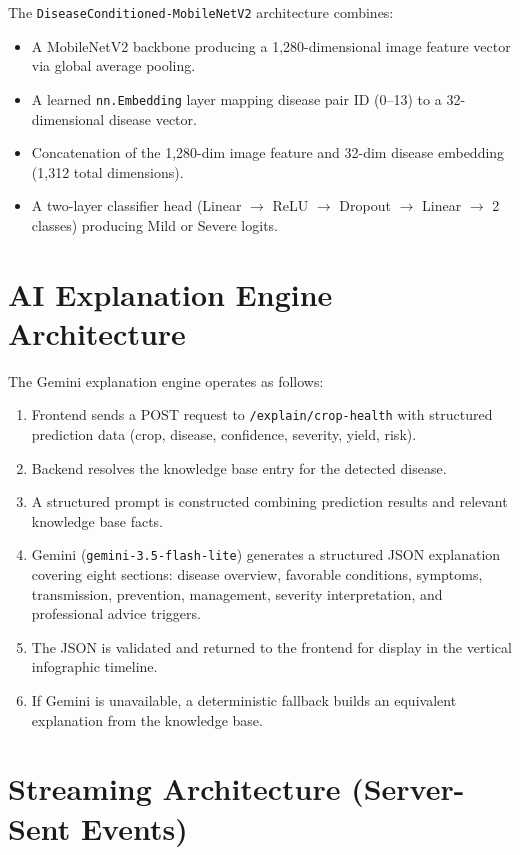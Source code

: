 The \texttt{DiseaseConditioned-}\allowbreak\texttt{MobileNetV2} architecture combines:
\begin{itemize}
    \item A MobileNetV2 backbone producing a 1,280-dimensional image feature vector via global average pooling.
    \item A learned \texttt{nn.Embedding} layer mapping disease pair ID (0--13) to a 32-dimensional disease vector.
    \item Concatenation of the 1,280-dim image feature and 32-dim disease embedding (1,312 total dimensions).
    \item A two-layer classifier head (Linear $\rightarrow$ ReLU $\rightarrow$ Dropout $\rightarrow$ Linear $\rightarrow$ 2 classes) producing Mild or Severe logits.
\end{itemize}

\section{AI Explanation Engine Architecture}

The Gemini explanation engine operates as follows:
\begin{enumerate}
    \item Frontend sends a POST request to \texttt{/explain/crop-health} with structured prediction data (crop, disease, confidence, severity, yield, risk).
    \item Backend resolves the knowledge base entry for the detected disease.
    \item A structured prompt is constructed combining prediction results and relevant knowledge base facts.
    \item Gemini (\texttt{gemini-3.5-flash-lite}) generates a structured JSON explanation covering eight sections: disease overview, favorable conditions, symptoms, transmission, prevention, management, severity interpretation, and professional advice triggers.
    \item The JSON is validated and returned to the frontend for display in the vertical infographic timeline.
    \item If Gemini is unavailable, a deterministic fallback builds an equivalent explanation from the knowledge base.
\end{enumerate}

\section{Streaming Architecture (Server-Sent Events)}

